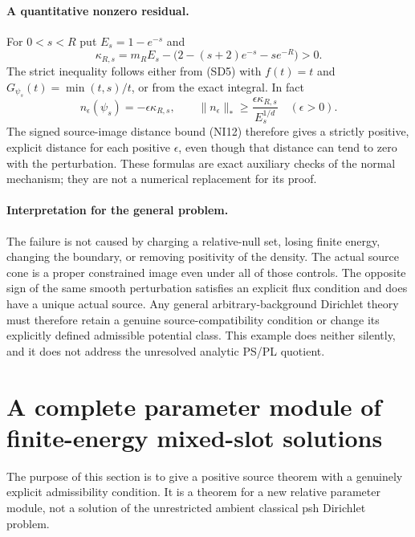 \documentclass[11pt,a4paper]{article}
\numberwithin{equation}{section}
\theoremstyle{definition}
\theoremstyle{remark}
\begin{document}
\paragraph{A quantitative nonzero residual.}
For $0<s<R$ put $E_s=1-e^{-s}$ and
\[
 \kappa_{R,s}
   =m_R E_s-\bigl(2-(s+2)e^{-s}-s e^{-R}\bigr)>0.
 \tag{SD13}
\]
The strict inequality follows either from
\textup{(SD5)} with $f(t)=t$ and
$G_{\psi_s}(t)=\min(t,s)/t$, or from the exact
integral.  In fact
\[
 n_\epsilon(\psi_s)=-\epsilon\kappa_{R,s},\qquad
 \|n_\epsilon\|_*
             \ge\frac{\epsilon\kappa_{R,s}}{E_s^{1/d}}
                       \quad(\epsilon>0).
 \tag{SD14}
\]
The signed source-image distance bound \textup{(NI12)}
therefore gives a strictly positive, explicit distance
for each positive $\epsilon$, even though that distance
can tend to zero with the perturbation.  These formulas
are exact auxiliary checks of the normal mechanism;
they are not a numerical replacement for its proof.

\paragraph{Interpretation for the general problem.}
The failure is not caused by charging a relative-null
set, losing finite energy, changing the boundary, or
removing positivity of the density.  The actual source
cone is a proper constrained image even under all of
those controls.  The opposite sign of the same smooth
perturbation satisfies an explicit flux condition and
does have a unique actual source.  Any general
arbitrary-background Dirichlet theory must therefore
retain a genuine source-compatibility condition or
change its explicitly defined admissible potential
class.  This example does neither silently, and it
does not address the unresolved analytic PS/PL quotient.



\section{A complete parameter module of finite-energy mixed-slot solutions}
\label{sec:r12-parameter-energy-Dirichlet}

The purpose of this section is to give a positive source theorem
with a genuinely explicit admissibility condition. It is a theorem
for a new relative parameter module, not a solution of the
unrestricted ambient classical psh Dirichlet problem.
\end{document}
